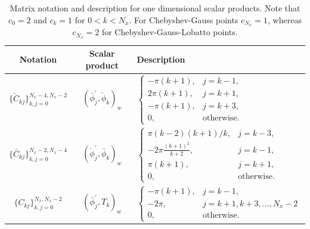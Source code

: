 \documentclass[preprint]{elsarticle}
\newcommand{\N}[1]{\check{#1}}
\newcommand{\D}[1]{\bar{#1}}
\begin{document}
\begin{table}
	\centering
	\caption{Matrix notation and description for one dimensional scalar products. Note that $c_0=2$ and $c_k=1$ for $0<k<N_x$. For Chebyshev-Gauss points $c_{N_x}=1$, whereas $c_{N_x}=2$ for Chebyshev-Gauss-Lobatto points.	\label{tab:matrices}}
	\begin{tabular}{ccl}	
		Notation & Scalar product & Description \\ 
		\hline
%

$\{\N{C}_{kj}\}_{k,j=0}^{N_x-4, N_x-2}$ & $\left(\D{\phi}^{'}_j, \N{\phi}_k 
\right)_w$ & $\begin{cases} -\pi(k+1), &j=k-1,\\
2\pi(k+1), & j=k+1, \\
-\pi(k+1), & j=k+3, \\
0, &\text{otherwise.} \end{cases}$ \\

$\{\D{C}_{kj}\}_{k,j=0}^{N_x-2, N_x-4}$ & $\left(\N{\phi}^{'}_j, \D{\phi}_k 
\right)_w$ & $\begin{cases}
\pi (k-2)(k+1)/k, &j=k-3,\\
-2 \pi \frac{(k+1)^2}{k+2}, & j=k-1, \\
\pi(k+1), & j=k+1, \\
0, &\text{otherwise.}
\end{cases}$ \\

$\{{C}_{kj}\}_{k,j=0}^{N_x, N_x-2}$ & $\left(\D{\phi}^{'}_j, T_k 
\right)_w$ & $\begin{cases}
-\pi (k+1), &j=k-1,\\
-2 \pi, & j=k+1,k+3, \ldots, N_x-2 \\
0, &\text{otherwise.}
\end{cases}$ \\



\end{tabular}
\end{table}
\end{document}
